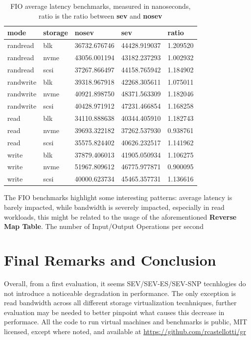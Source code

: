 \documentclass[twocolumn]{article}
\begin{document}
\begin{table}
    \small
    \begin{tabular}{lllll}
        \hline
        \textbf{mode}& \textbf{storage} & \textbf{nosev} & \textbf{sev} & \textbf{ratio} \\
        \hline
        randread     & blk              & 36732.676746   & 44428.919037 & 1.209520       \\
        randread     & nvme             & 43056.001194   & 43182.237293 & 1.002932       \\
        randread     & scsi             & 37267.866497   & 44158.765942 & 1.184902       \\
        randwrite    & blk              & 39318.967918   & 42268.305611 & 1.075011       \\
        randwrite    & nvme             & 40921.898750   & 48371.563309 & 1.182046       \\
        randwrite    & scsi             & 40428.971912   & 47231.466854 & 1.168258       \\
        read         & blk              & 34110.888638   & 40344.405910 & 1.182743       \\
        read         & nvme             & 39693.322182   & 37262.537930 & 0.938761       \\
        read         & scsi             & 35575.824402   & 40626.232517 & 1.141962       \\
        write        & blk              & 37879.406013   & 41905.050934 & 1.106275       \\
        write        & nvme             & 51967.809612   & 46775.977871 & 0.900095       \\
        write        & scsi             & 40000.623734   & 45465.357731 & 1.136616       \\
        \hline
    \end{tabular}
    \caption{FIO average latency benchmarks, measured in nanoseconds, ratio is the ratio between \textbf{sev} and \textbf{nosev}}
    \label{tab:al}
\end{table}

The FIO benchmarks highlight some interesting patterns: average latency is barely impacted, while bandwidth is severely impacted, especially in read workloads, this might be related to the usage of the aforementioned \textbf{Reverse Map Table}. The number of Input/Output Operations per second

\section{Final Remarks and Conclusion}
Overall, from a first evaluation, it seems SEV/SEV-ES/SEV-SNP tecnhlogies do not introduce a noticeable degradation in performance. The only exception is read bandwidth across all different storage virtualization tecnhniques, further evaluation may be needed to better pinpoint what causes this decrease in performace.
All the code to run virtual machines and benchmarks is public, MIT licensed, except where noted, and available at \href{https://github.com/rcastellotti/gr}{https://github.com/rcastellotti/gr}
\end{document}
